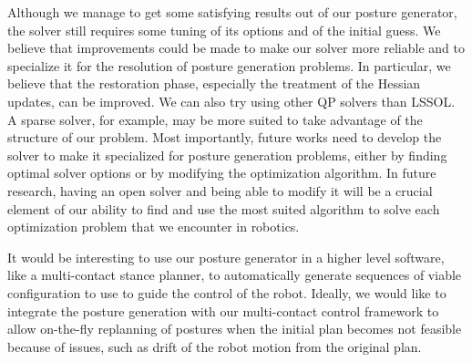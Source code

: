 Although we manage to get some satisfying results out of our posture generator, the solver still requires some tuning of its options and of the initial guess.
We believe that improvements could be made to make our solver more reliable and to specialize it for the resolution of posture generation problems.
In particular, we believe that the restoration phase, especially the treatment of the Hessian updates, can be improved.
We can also try using other QP solvers than LSSOL.
A sparse solver, for example, may be more suited to take advantage of the structure of our problem.
Most importantly, future works need to develop the solver to make it specialized for posture generation problems, either by finding optimal solver options or by modifying the optimization algorithm.
In future research, having an open solver and being able to modify it will be a crucial element of our ability to find and use the most suited algorithm to solve each optimization problem that we encounter in robotics.

It would be interesting to use our posture generator in a higher level software, like a multi-contact stance planner, to automatically generate sequences of viable configuration to use to guide the control of the robot.
Ideally, we would like to integrate the posture generation with our multi-contact control framework to allow on-the-fly replanning of postures when the initial plan becomes not feasible because of issues, such as drift of the robot motion from the original plan.





